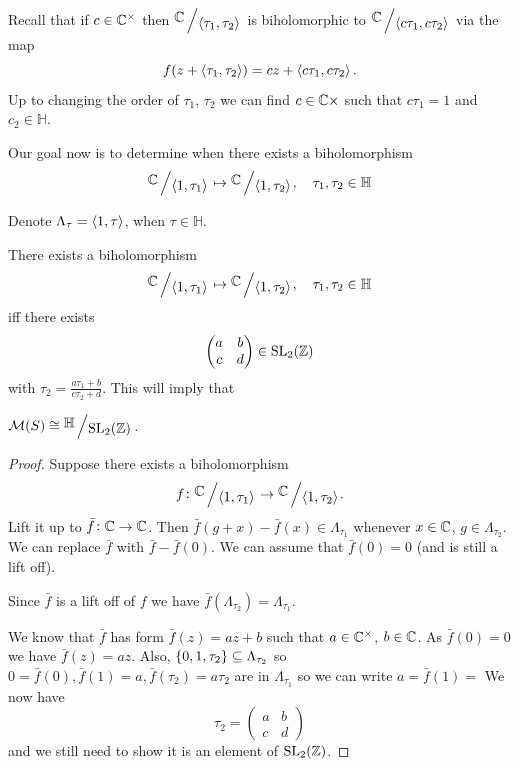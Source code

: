 \documentclass[11pt,a4paper]{article}
\renewcommand{\H}{\mathbb H}
\begin{document}
Recall that if $c \in \mathbb{C}^{\times}$ then $\bigslant{\C}{\ip{\tau_1}{\tau_2}}$
is biholomorphic to $\bigslant{\C}{\ip{c \tau_1}{c \tau_2}}$ via the map
\[
  f(z + \left\langle \tau_1, \tau_2 \right\rangle) = cz + \left\langle c \tau_1, c \tau_2 \right\rangle.
\]
Up to changing the order of $\tau_1$, $\tau_2$ we can find $c \in \mathbb{C}{\times}$
such that $c \tau_1 = 1$ and $c_2 \in \H$.

Our goal now is to determine when there exists a biholomorphism
\[
  \bigslant{\C}{\ip{1}{\tau_1}} \mapsto
  \bigslant{\C}{\ip{1}{\tau_2}}, \quad \tau_1,\tau_2 \in \H
\]

Denote $\Lambda_{\tau} = \left\langle 1, \tau \right\rangle$, when $\tau \in \H$.

\begin{theorem}
There exists a biholomorphism
\[
  \bigslant{\C}{\ip{1}{\tau_1}} \mapsto
  \bigslant{\C}{\ip{1}{\tau_2}}, \quad \tau_1,\tau_2 \in \H
\]
iff there exists 
\[
  \begin{pmatrix}
    a & b \\
    c & d
  \end{pmatrix} \in \mathrm{SL}_2(\mathbb{Z})
\]
with $\tau_2= \frac{a \tau_1 + b}{c \tau_2 + d}$.
This will imply that \item $\M(S) \cong \bigslant{\H}{\SL_2(\Z)}$.
\end{theorem}
\begin{proof}
  Suppose there exists a biholomorphism 
  \[
    f \colon \bigslant{\C}{\ip{1}{\tau_1}} \to
    \bigslant{\C}{\ip{1}{\tau_2}}.
  \]
  Lift it up to $\bar f \colon \mathbb{C} \to \mathbb{C}$.
  Then $\bar f(g + x) - \bar f(x) \in \Lambda_{\tau_1}$
  whenever $x \in \mathbb{C}$, $g \in \Lambda_{\tau_2}$.
  We can replace $\bar f$ with $\bar f - \bar f(0)$.
  We can assume that $\bar f(0) = 0$ (and is still a lift off).
  \begin{remark}
    Since $\bar f$ is a lift off of $f$ we have 
    $\bar f(\Lambda_{\tau_2}) = \Lambda_{\tau_1}$.
  \end{remark}
  We know that $\bar f$ has form $\bar f(z) = a z + b$ such that
  $a \in \mathbb{C}^{\times}$, $b \in \mathbb{C}$.
  As $\bar f(0) = 0$ we have $\bar f(z) = a z$.
  Also, $\left\{0,1,\tau_2\right\} \subseteq \Lambda_{\tau_2}$ so 
  $0 = \bar f(0), \bar f(1) = a, \bar f(\tau_2) = a \tau_2$ are in
  $\Lambda_{\tau_1}$ so we can write $a = \bar f(1) = $
  We now have
  \[
    \tau_2 =
    \begin{pmatrix}
      a & b \\
      c & d
    \end{pmatrix}
  \]
  and we still need to show it is an element of $\mathrm{SL}_2(\mathbb{Z})$.
\end{proof}
\end{document}

